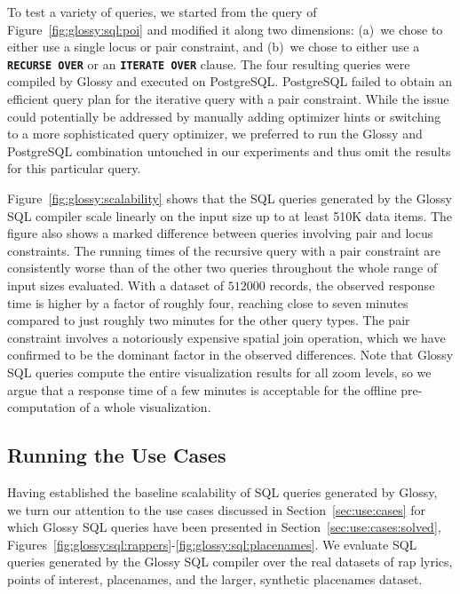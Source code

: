 \documentclass[11pt, oneside]{report}
\begin{document}
{To test a variety of queries, we started from the query of Figure~\ref{fig:glossy:sql:poi} and modified it along two dimensions: (a)~we chose to either use a single locus or pair constraint, and (b)~we chose to either use a \textbf{\texttt{RECURSE OVER}} or an \textbf{\texttt{ITERATE OVER}} clause. The four resulting queries were compiled by Glossy and executed on PostgreSQL. PostgreSQL failed to obtain an efficient query plan for the iterative query with a pair constraint. While the issue could potentially be addressed by manually adding optimizer hints or switching to a more sophisticated query optimizer, we preferred to  run the Glossy and PostgreSQL combination untouched in our experiments and thus omit the results for this particular query. 

Figure~\ref{fig:glossy:scalability} shows that the SQL queries generated by the Glossy SQL compiler scale linearly on the input size up to at least 510K data items. The figure also shows a marked difference between queries involving pair and locus constraints. The running times of the recursive query with a pair constraint are consistently worse than of the other two queries throughout the whole range of input sizes evaluated. With a dataset of $512000$ records, the observed response time is higher by a factor of roughly four, reaching close to seven minutes compared to just roughly two minutes for the other query types. The pair constraint involves a notoriously expensive spatial join operation, which we have confirmed to be the dominant factor in the observed differences. Note that Glossy SQL queries compute the entire visualization results for all zoom levels, so we argue that a response time of a few minutes is acceptable for the offline pre-computation of a whole visualization.     


\subsection{Running the Use Cases}

Having established the baseline scalability of SQL queries generated by Glossy, we turn our attention to the use cases discussed in Section~\ref{sec:use:cases} for which Glossy SQL queries have been presented in Section~\ref{sec:use:cases:solved}, Figures~\ref{fig:glossy:sql:rappers}-\ref{fig:glossy:sql:placenames}. We evaluate SQL queries generated by the Glossy SQL compiler over the real datasets of rap lyrics, points of interest, placenames, and the larger, synthetic placenames dataset. 

}
\end{document}
